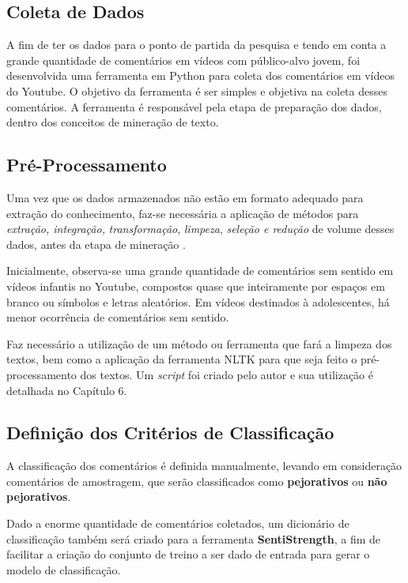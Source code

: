 \subsection{Coleta de Dados}
A fim de ter os dados para o ponto de partida da pesquisa e tendo em conta a grande quantidade de comentários em vídeos com público-alvo jovem, foi desenvolvida uma ferramenta em Python para coleta dos comentários em vídeos do Youtube. O objetivo da ferramenta é ser simples e objetiva na coleta desses comentários. A ferramenta é responsável pela etapa de preparação dos dados, dentro dos conceitos de mineração de texto.


\subsection{Pré-Processamento}
Uma vez que os dados armazenados não estão em formato adequado para extração do conhecimento, faz-se necessária a aplicação de métodos para \textit{extração, integração,} \textit{transformação},
\textit{limpeza}, \textit{seleção e redução} de volume desses dados, antes da etapa de mineração \cite{morais2007mineraccao}.

Inicialmente, observa-se uma grande quantidade de comentários sem sentido em vídeos infantis no Youtube, compostos quase que inteiramente por espaços em branco ou símbolos e letras aleatórios. Em vídeos destinados à adolescentes, há menor ocorrência de comentários sem sentido. 

Faz necessário a utilização de um método ou ferramenta que fará a limpeza dos textos, bem como a aplicação da ferramenta NLTK para que seja feito o pré-processamento dos textos. Um \textit{script} foi criado pelo autor e sua utilização é detalhada no Capítulo 6.


\subsection{Definição dos Critérios de Classificação}

A classificação dos comentários é definida manualmente, levando em consideração comentários de amostragem, que serão classificados como \textbf{pejorativos} ou \textbf{não pejorativos}. 

Dado a enorme quantidade de comentários coletados, um dicionário de classificação também será criado para a ferramenta \textbf{SentiStrength}, a fim de facilitar a criação do conjunto de treino a ser dado de entrada para gerar o modelo de classificação. 

